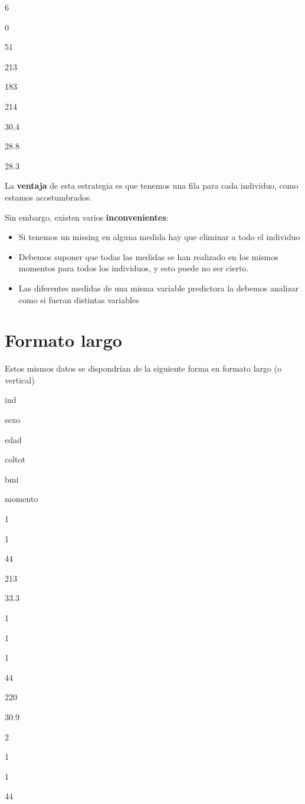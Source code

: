 \documentclass[
]{book}
\begin{document}
6

0

51

213

183

214

30.4

28.8

28.3

La \textbf{ventaja} de esta estrategia es que tenemos una fila para cada individuo, como estamos acostumbrados.

Sin embargo, existen varios \textbf{inconvenientes}:

\begin{itemize}
\item
  Si tenemos un missing en alguna medida hay que eliminar a todo el individuo
\item
  Debemos suponer que todas las medidas se han realizado en los mismos momentos para todos los individuos, y esto puede no ser cierto.
\item
  Las diferentes medidas de una misma variable predictora la debemos analizar como si fueran distintas variables
\end{itemize}

\hypertarget{formato-largo}{%
\section{Formato largo}\label{formato-largo}}

Estos mismos datos se dispondrían de la siguiente forma en formato largo (o vertical)

ind

sexo

edad

coltot

bmi

momento

1

1

44

213

33.3

1

1

1

44

220

30.9

2

1

1

44
\end{document}
